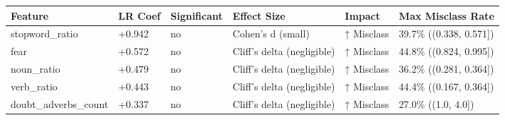 \begin{tabular}{llllll}
\toprule
Feature & LR Coef & Significant & Effect Size & Impact & Max Misclass Rate \\
\midrule
stopword\_ratio & +0.942 & no & Cohen's d (small) & ↑ Misclass & 39.7\% ((0.338, 0.571]) \\
fear & +0.572 & no & Cliff's delta (negligible) & ↑ Misclass & 44.8\% ((0.824, 0.995]) \\
noun\_ratio & +0.479 & no & Cliff's delta (negligible) & ↑ Misclass & 36.2\% ((0.281, 0.364]) \\
verb\_ratio & +0.443 & no & Cliff's delta (negligible) & ↑ Misclass & 44.4\% ((0.167, 0.364]) \\
doubt\_adverbs\_count & +0.337 & no & Cliff's delta (negligible) & ↑ Misclass & 27.0\% ((1.0, 4.0]) \\
\bottomrule
\end{tabular}
